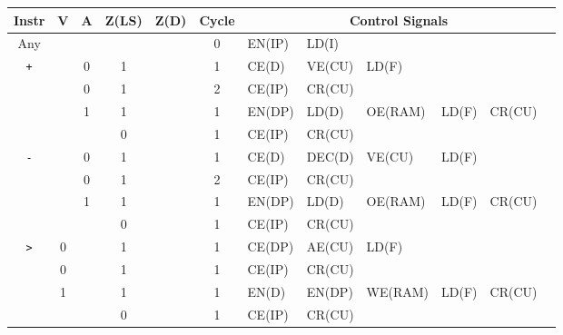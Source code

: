 

  \begin{longtable}[c] {c|cccc|c|llllll}
                     Instr        & V & A & Z(LS) & Z(D) & Cycle & \multicolumn{6}{c}{Control Signals}                      \\ \hline
    \rowcolor{White} Any          &   &   &       &      & 0     & EN(IP)   & LD(I)    &         &        &        &        \\ \hline
    \rowcolor{Gray}  \texttt{+}   &   & 0 & 1     &      & 1     & CE(D)    & VE(CU)   & LD(F)   &        &        &        \\
    \rowcolor{Gray}               &   & 0 & 1     &      & 2     & CE(IP)   & CR(CU)   &         &        &        &        \\    
    \rowcolor{White}              &   & 1 & 1     &      & 1     & EN(DP)   & LD(D)    & OE(RAM) & LD(F)  & CR(CU) &        \\
    \rowcolor{Gray}               &   &   & 0     &      & 1     & CE(IP)   & CR(CU)   &         &        &        &        \\ \hline
    
    \rowcolor{White} \texttt{-}   &   & 0 & 1     &      & 1     & CE(D)    & DEC(D)   & VE(CU)  & LD(F)  &        &        \\
    \rowcolor{White}              &   & 0 & 1     &      & 2     & CE(IP)   & CR(CU)   &         &        &        &        \\
    \rowcolor{Gray}               &   & 1 & 1     &      & 1     & EN(DP)   & LD(D)    & OE(RAM) & LD(F)  & CR(CU) &        \\
    \rowcolor{White}              &   &   & 0     &      & 1     & CE(IP)   & CR(CU)   &         &        &        &        \\ \hline
    
    \rowcolor{Gray}  \texttt{>}   & 0 &   & 1     &      & 1     & CE(DP)   & AE(CU)   & LD(F)   &        &        &        \\
    \rowcolor{Gray}               & 0 &   & 1     &      & 1     & CE(IP)   & CR(CU)   &         &        &        &        \\
    \rowcolor{White}              & 1 &   & 1     &      & 1     & EN(D)    & EN(DP)   & WE(RAM) & LD(F)  & CR(CU) &        \\
    \rowcolor{Gray}               &   &   & 0     &      & 1     & CE(IP)   & CR(CU)   &         &        &        &        \\ \hline
    

\end{longtable}
